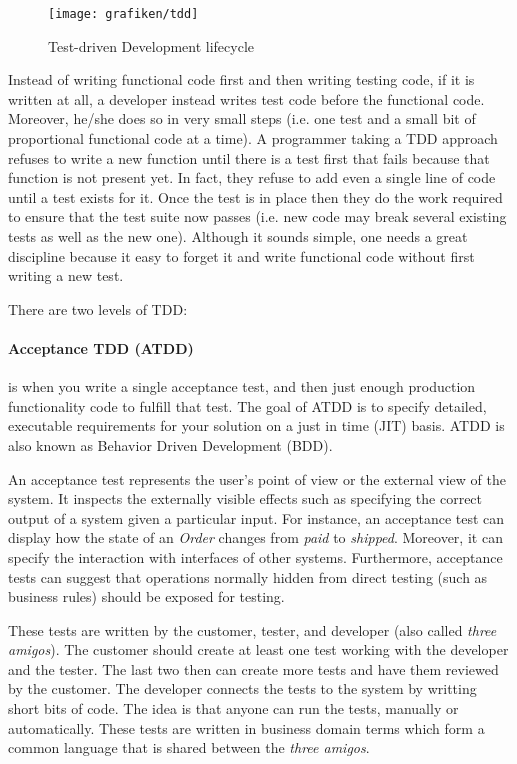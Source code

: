 \begin{figure}[H]
	\centering
    \texttt{[image: grafiken/tdd]}
    \caption{Test-driven Development lifecycle\cite{Ambler2013}}
    \label{fig:tdd}
\end{figure}

Instead of writing functional code first and then writing testing code, if it is written at all, a developer instead writes test code before the functional code. Moreover, he/she does so in very small steps (i.e. one test and a small bit of proportional functional code at a time). A programmer taking a TDD approach refuses to write a new function until there is a test first that fails because that function is not present yet. In fact, they refuse to add even a single line of code until a test exists for it. Once the test is in place then they do the work required to ensure that the test suite now passes (i.e. new code may break several existing tests as well as the new one). Although it sounds simple, one needs a great discipline because it easy to forget it and write functional code without first writing a new test.

There are two levels of TDD\cite{Ambler2013}:

\paragraph{Acceptance TDD (ATDD)} is when you write a single acceptance test, and then just enough production functionality code to fulfill that test. The goal of ATDD is to specify detailed, executable requirements for your solution on a just in time (JIT) basis\cite{Ambler2013}. ATDD is also known as Behavior Driven Development (BDD).

An acceptance test represents the user's point of view or the external view of the system. It inspects the externally visible effects such as specifying the correct output of a system given a particular input. For instance, an acceptance test can display how the state of an \emph{Order} changes from \emph{paid} to \emph{shipped}. Moreover, it can specify the interaction with interfaces of other systems. Furthermore, acceptance tests can suggest that operations normally hidden from direct testing (such as business rules) should be exposed for testing\cite{KennethPugh2011}.

These tests are written by the customer, tester, and developer (also called \emph{three amigos}\cite{Dinwiddie2009}). The customer should create at least one test working with the developer and the tester. The last two then can create more tests and have them reviewed by the customer. The developer connects the tests to the system by writting short bits of code. The idea is that anyone can run the tests, manually or automatically. These tests are written in business domain terms which form a common language that is shared between the \emph{three amigos}\cite{KennethPugh2011}.

